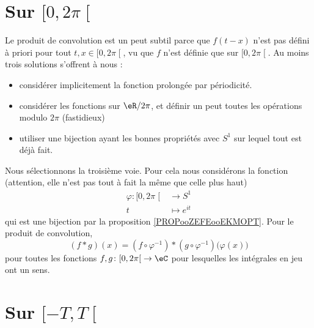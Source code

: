 \section{Sur \( \mathopen[ 0 , 2\pi \mathclose[\)}

Le produit de convolution est un peut subtil parce que \( f(t-x)\) n'est pas défini à priori pour tout \( t,x\in \mathopen[ 0 , 2\pi \mathclose[\), vu que \( f\) n'est définie que sur \( \mathopen[ 0 , 2\pi \mathclose[\). Au moins trois solutions s'offrent à nous :
\begin{itemize}
    \item 
       considérer implicitement la fonction prolongée par périodicité.
   \item
       considérer les fonctions sur \( \eR/2\pi\), et définir un peut toutes les opérations modulo \( 2\pi\) (fastidieux)
   \item
       utiliser une bijection ayant les bonnes propriétés avec \( S^1\) sur lequel tout est déjà fait.
\end{itemize}
Nous sélectionnons la troisième voie. Pour cela nous considérons la fonction (attention, elle n'est pas tout à fait la même que celle plus haut)
\begin{equation}
    \begin{aligned}
        \varphi\colon \mathopen[ 0 , 2\pi \mathclose[&\to S^1 \\
            t&\mapsto  e^{it} 
    \end{aligned}
\end{equation}
qui est une bijection par la proposition \ref{PROPooZEFEooEKMOPT}. Pour le produit de convolution,
\begin{equation}
    (f * g)(x)=(f\circ \varphi^{-1})*(g\circ\varphi^{-1})\big( \varphi(x) \big)
\end{equation}
pour toutes les fonctions \( f,g\colon \mathopen[ 0 , 2\pi \mathclose[\to \eC\) pour lesquelles les intégrales en jeu ont un sens.

\section{Sur \( \mathopen[ -T , T \mathclose[\)}

